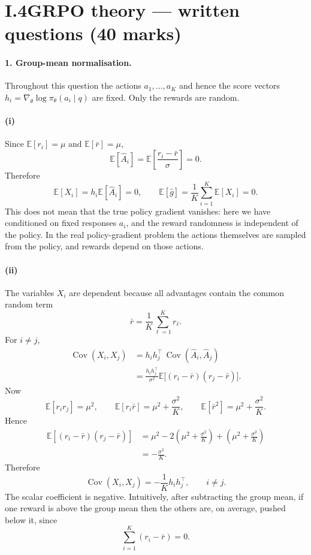 \section*{I.4\quad GRPO theory --- written questions (40 marks)}

\paragraph{1. Group-mean normalisation.}
Throughout this question the actions \(a_1,\ldots,a_K\) and hence the score
vectors \(h_i=\nabla_\theta \log \pi_\theta(a_i\mid q)\) are fixed. Only the
rewards are random.

\paragraph{(i)}
Since \(\mathbb E[r_i]=\mu\) and \(\mathbb E[\bar r]=\mu\),
\[
\mathbb E[\hat A_i]
=
\mathbb E\left[\frac{r_i-\bar r}{\sigma}\right]
=
0.
\]
Therefore
\[
\mathbb E[X_i]
=
h_i \mathbb E[\hat A_i]
=
0,
\qquad
\mathbb E[\hat g]
=
\frac{1}{K}\sum_{i=1}^K \mathbb E[X_i]
=
0.
\]
This does not mean that the true policy gradient vanishes: here we have
conditioned on fixed responses \(a_i\), and the reward randomness is independent
of the policy. In the real policy-gradient problem the actions themselves are
sampled from the policy, and rewards depend on those actions.

\paragraph{(ii)}
The variables \(X_i\) are dependent because all advantages contain the common
random term
\[
\bar r=\frac{1}{K}\sum_{\ell=1}^K r_\ell .
\]
For \(i\neq j\),
\begin{align}
\operatorname{Cov}(X_i,X_j)
&=
h_i h_j^\top \,
\operatorname{Cov}(\hat A_i,\hat A_j)  \\
&=
\frac{h_i h_j^\top}{\sigma^2}
\mathbb E\big[(r_i-\bar r)(r_j-\bar r)\big].
\end{align}
Now
\[
\mathbb E[r_i r_j]=\mu^2,
\qquad
\mathbb E[r_i\bar r]=\mu^2+\frac{\sigma^2}{K},
\qquad
\mathbb E[\bar r^2]=\mu^2+\frac{\sigma^2}{K}.
\]
Hence
\begin{align}
\mathbb E[(r_i-\bar r)(r_j-\bar r)]
&=
\mu^2
-
2\left(\mu^2+\frac{\sigma^2}{K}\right)
+
\left(\mu^2+\frac{\sigma^2}{K}\right)  \\
&=
-\frac{\sigma^2}{K}.
\end{align}
Therefore
\[
\boxed{
\operatorname{Cov}(X_i,X_j)
=
-\frac{1}{K} h_i h_j^\top ,
\qquad i\neq j.
}
\]
The scalar coefficient is negative. Intuitively, after subtracting the group
mean, if one reward is above the group mean then the others are, on average,
pushed below it, since
\[
\sum_{i=1}^K (r_i-\bar r)=0.
\]

